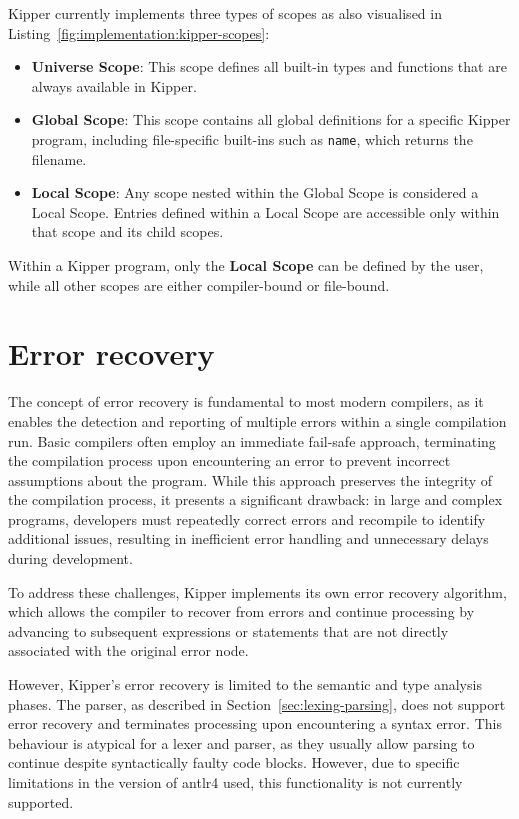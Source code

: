 Kipper currently implements three types of scopes as also visualised in Listing~\ref{fig:implementation:kipper-scopes}:

\begin{itemize}
	\item \textbf{Universe Scope}: This scope defines all built-in types and functions that are always available in Kipper.
	\item \textbf{Global Scope}: This scope contains all global definitions for a specific Kipper program, including file-specific built-ins such as \lstinline|name|, which returns the filename.
	\item \textbf{Local Scope}: Any scope nested within the Global Scope is considered a Local Scope. Entries defined within a Local Scope are accessible only within that scope and its child scopes.
\end{itemize}

Within a Kipper program, only the \textbf{Local Scope} can be defined by the user, while all other scopes are either compiler-bound or file-bound.

\section{Error recovery}
\label{sec:error-recovery}

The concept of error recovery is fundamental to most modern compilers, as it enables the detection and reporting of multiple errors within a single compilation run. Basic compilers often employ an immediate fail-safe approach, terminating the compilation process upon encountering an error to prevent incorrect assumptions about the program. While this approach preserves the integrity of the compilation process, it presents a significant drawback: in large and complex programs, developers must repeatedly correct errors and recompile to identify additional issues, resulting in inefficient error handling and unnecessary delays during development.

To address these challenges, Kipper implements its own error recovery algorithm, which allows the compiler to recover from errors and continue processing by advancing to subsequent expressions or statements that are not directly associated with the original error node.

However, Kipper's error recovery is limited to the semantic and type analysis phases. The parser, as described in Section~\ref{sec:lexing-parsing}, does not support error recovery and terminates processing upon encountering a syntax error. This behaviour is atypical for a lexer and parser, as they usually allow parsing to continue despite syntactically faulty code blocks. However, due to specific limitations in the version of \Gls{antlr4} used, this functionality is not currently supported.

